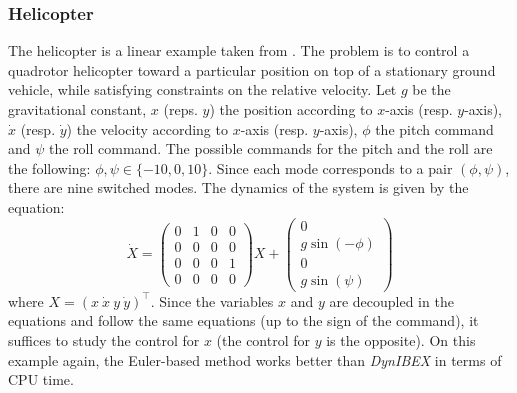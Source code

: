  \subsubsection{Helicopter}
 \label{sec:helico}
 
 The helicopter is a linear example taken from \cite{ding2011reachability}. The problem is to control a quadrotor helicopter toward 
 a particular position on top of a stationary ground vehicle, while satisfying constraints 
 on the relative velocity. 
Let $g$ 
 be the gravitational constant, $x$ (reps. $y$) the position 
 according to $x$-axis (resp. $y$-axis), $\dot x$ (resp. $\dot y$) the velocity according to $x$-axis (resp. $y$-axis),
 $\phi$ the pitch command and $\psi$ the roll command. 
 The possible commands for the pitch and the roll are 
 the following: $\phi,\psi \in \{ -10,0,10 \}$.
 Since each mode corresponds to a pair $(\phi,\psi)$, there are nine switched modes.
 The dynamics of the system is given by the equation:
 $$ \dot X = \begin{pmatrix}
              0 & 1 & 0 & 0 \\ 
              0 & 0 & 0 & 0 \\ 
              0 & 0 & 0 & 1 \\               
              0 & 0 & 0 & 0               
              \end{pmatrix} X + \begin{pmatrix}
              0 \\ g\sin(-\phi) \\ 0 \\ g\sin(\psi) \end{pmatrix}              
 $$
where $X = ( x \ \dot x \ y \ \dot y)^\top$. Since the variables $x$ and $y$
are decoupled in the equations and follow the same equations (up to the sign of the command), it suffices
to study the control for $x$ (the control for $y$ is the opposite).
On this example again, the Euler-based method works better than {\em DynIBEX}
in terms of CPU time.

